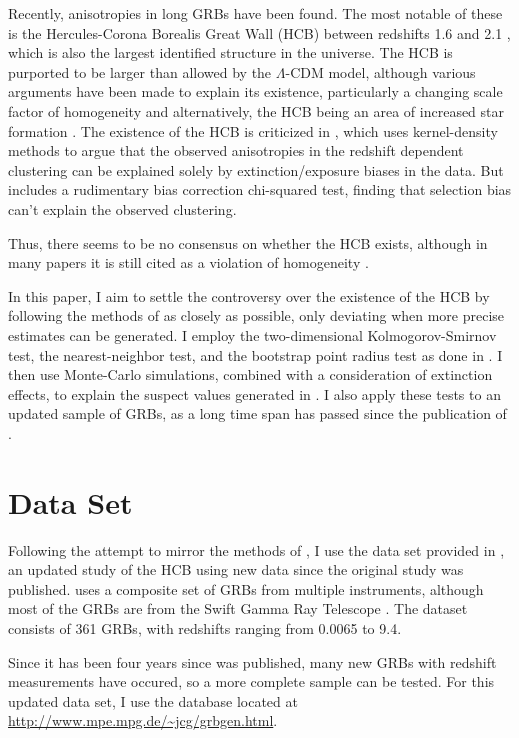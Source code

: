 \documentclass[fleqn,usenatbib]{mnras}
\begin{document}
Recently, anisotropies in long GRBs have been found. The most notable of these is the Hercules-Corona Borealis Great Wall (HCB) between redshifts 1.6 and 2.1 \citep{horvath2014}, which is also the largest identified structure in the universe. The HCB is purported to be larger than allowed by the $\Lambda$-CDM model, although various arguments have been made to explain its existence, particularly a changing scale factor of homogeneity \citep{li2015} and alternatively, the HCB being an area of increased star formation \citep{Balazas2015}. The existence of the HCB is criticized in \citet{ukwatta2016}, which uses kernel-density methods to argue that the observed anisotropies in the redshift dependent clustering can be explained solely by extinction/exposure biases in the data. But \citet{horvath2014} includes a rudimentary bias correction chi-squared test, finding that selection bias can't explain the observed clustering.

Thus, there seems to be no consensus on whether the HCB exists, although in many papers it is still cited as a violation of homogeneity \citep{racz2017, eingorn2017}.

In this paper, I aim to settle the controversy over the existence of the HCB by following the methods of \citet{horvath2014} as closely as possible, only deviating when more precise estimates can be generated. I employ the two-dimensional Kolmogorov-Smirnov test, the nearest-neighbor test, and the bootstrap point radius test as done in \citet{horvath2014}. I then use Monte-Carlo simulations, combined with a consideration of extinction effects, to explain the suspect values generated in \citet{horvath2014}. I also apply these tests to an updated sample of GRBs, as a long time span has passed since the publication of \citet{horvath2015}.

\section{Data Set}

Following the attempt to mirror the methods of \citet{horvath2014}, I use the data set provided in \citet{horvath2015}, an updated study of the HCB using new data since the original study was published. \citet{horvath2015} uses a composite set of GRBs from multiple instruments, although most of the GRBs are from the Swift Gamma Ray Telescope \citep{Sakamoto2008}. The dataset consists of 361 GRBs, with redshifts ranging from 0.0065 to 9.4.

Since it has been four years since \citet{horvath2015} was published, many new GRBs with redshift measurements have occured, so a more complete sample can be tested. For this updated data set, I use the database located at \url{http://www.mpe.mpg.de/~jcg/grbgen.html}.
\end{document}
